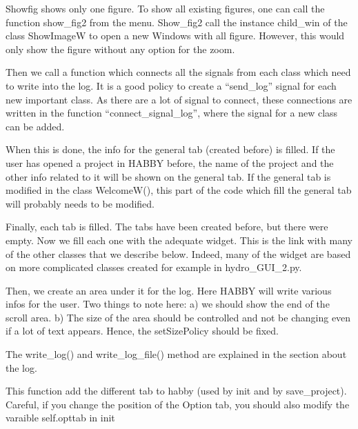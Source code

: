 \documentclass[letterpaper,10pt,english]{sphinxmanual}
\begin{document}
\begin{fulllineitems}
Showfig shows only one figure. To show all existing figures, one can call the function show\_fig2 from the menu.
Show\_fig2 call the instance child\_win of the class ShowImageW to open a new Windows with all figure. However,
this would only show the figure without any option for the zoom.

Then we call a function which connects all the signals from each class which need to write into the log. It is a good
policy to create a “send\_log” signal for each new important class. As there are a lot of signal to connect, these
connections are written in the function “connect\_signal\_log”, where the signal for a new class can be added.

When this is done, the info for the general tab (created before) is filled. If the user has opened a project in HABBY
before, the name of the project and the other info related to it will be shown on the general tab. If the general
tab is modified in the class WelcomeW(), this part of the code which fill the general tab will probably needs to
be modified.

Finally, each tab is filled. The tabs have been created before, but there were empty. Now we fill each one with the
adequate widget. This is the link with many of the other classes that we describe below. Indeed, many of the widget
are based on more complicated classes created for example in hydro\_GUI\_2.py.

Then, we create an area under it for the log. Here HABBY will write various infos for the user. Two things to note
here: a) we should show the end of the scroll area. b) The size of the area should be controlled and not be
changing even if a lot of text appears. Hence, the setSizePolicy should be fixed.

The write\_log() and write\_log\_file() method are explained in the section about the log.

\begin{fulllineitems}
\label{\detokenize{index:src_GUI.Main_windows_1.CentralW.add_all_tab}}
This function add the different tab to habby (used by init and by save\_project). Careful, if you change the
position of the Option tab, you should also modify the varaible self.opttab in init

\end{fulllineitems}



\end{fulllineitems}
\end{document}
